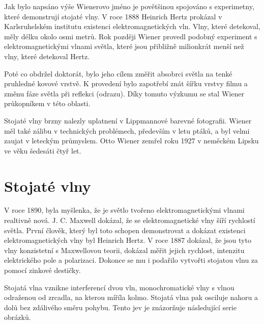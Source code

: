 \documentclass[12pt,a4paper,titlepage,final]{report}
\begin{document}
Jak bylo napsáno výše Wienerovo jméno je povětšinou spojováno s experimetny, které demonstrují stojaté vlny. V roce 1888 Heinrich Hertz
prokázal v Karlsruhelském institutu existenci elektromagnetických vln. Vlny, které detekoval, měly délku okolo osmi metrů. Rok později Wiener
provedl podobný experiment s elektromagnetickými vlnami světla, které jsou přibližně milionkrát menší než vlny, které detekoval Hertz. \cite{encyclopedia_otto}

Poté co obdržel doktorát, bylo jeho cílem změřit absobrci světla na tenké pruhledné kovové vrstvě. K provedení bylo zapotřebí znát šířku
vrstvy filmu a změnu fáze světla při reflekci (odrazu). Díky tomuto výzkumu se stal Wiener průkopníkem v této oblasti. \cite{encyclopedia_otto}

Stojaté vlny brzny nalezly uplatnení v Lippmannové barevné fotografii. Wiener měl také zálibu v technických problémech, především v letu ptáků, 
a byl velmi zaujat v leteckým průmyslem. Otto Wiener zemřel roku 1927 v neměckém Lipsku ve věku šedesáti čtyř let. \cite{wiki_otto}

\section{Stojaté vlny}
V roce 1890, byla myšlenka, že je světlo tvořeno elektromagnetickými
vlnami realtivně nová. J. C. Maxwell dokázal, že se elektromagnetické vlny šíří rychlostí světla. První člověk, který
byl toto schopen demonstrovat a dokázat existenci elektromagnetických vlny byl Heinrich Hertz. V roce 1887 dokázal, že jsou tyto vlny
konzistetní s Maxwellovou teorii, dokázal měřit jejich rychlost,
intenzitu elektrického pole a polarizaci. Dokonce se mu i 
podařilo vytvořti stojatou vlnu za pomocí zinkové destičky. \cite{skullsinthestars}

Stojatá vlna vznikne interferencí dvou vln, monochromatické vlny s vlnou odraženou od zrcadla, na kterou míříla kolmo.
Stojatá vlna pak osciluje nahoru a dolů bez zdálivého směru pohybu. Tento jev je znázorňuje následující serie obrázků.
\end{document}
